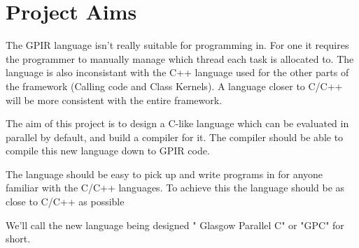 \section{Project Aims}

The GPIR language isn't really suitable for programming in. For one it requires the programmer to manually
manage which thread each task is allocated to. The language is also inconsistant with the C++ language used for 
the other parts of the framework (Calling code and Class Kernels). A language closer to C/C++ will be
more consistent with the entire framework.

The aim of this project is to design a C-like language which can be evaluated in parallel by default, and build
a compiler for it. The compiler should be able to compile this new language down to GPIR code. 

The language should be easy to pick up and write programs in for anyone familiar with the C/C++ languages.
To achieve this the language should be as close to C/C++ as possible 

We'll call the new language being designed " Glasgow Parallel C" or "GPC" for short.
